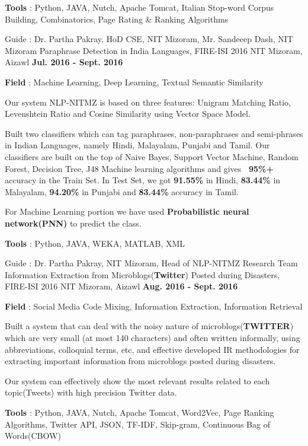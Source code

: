 \begin{cventries}
{\begin{cvitems}
        \item{\textbf{Tools} : Python, JAVA, Nutch, Apache Tomcat, Italian Stop-word Corpus Building, Combinatorics, Page Rating \& Ranking Algorithms}
      \end{cvitems} 
    }
  \cventry
    {Guide : Dr. Partha Pakray, HoD CSE, NIT Mizoram, Mr. Sandeeep Dash, NIT Mizoram}
    {Paraphrase Detection in India Languages, FIRE-ISI 2016}
    {NIT Mizoram, Aizawl}
    {\textbf{Jul. 2016 - Sept. 2016}}
    {
      \begin{cvitems}
      \item{\textbf{Field} : Machine Learning, Deep Learning, Textual Semantic Similarity}
        \item {Our system  NLP-NITMZ is based on three features: Unigram Matching Ratio, Levenshtein Ratio and Cosine Similarity using Vector Space Model.}
        \item {Built two classifiers which can tag paraphrases, non-paraphrases and semi-phrases in Indian Languages,
namely Hindi, Malayalam, Punjabi and Tamil. Our classifiers are built on the top of Naive Bayes, Support Vector Machine,
Random Forest, Decision Tree, J48 Machine learning algorithms and gives \textbf{~95\%+} accuracy in the Train Set. In Test Set, we got \textbf{91.55\%} in Hindi, \textbf{83.44\%} in Malayalam, \textbf{94.20\%} in Punjabi and \textbf{83.44\%} accuracy in Tamil.}
    \item{For Machine Learning portion we have used \textbf{Probabilistic neural network(PNN)} to predict the class.}
    \item{\textbf{Tools} : Python, JAVA, WEKA, MATLAB, XML}
      \end{cvitems}
    }
  \cventry
    {Guide : Dr. Partha Pakray, NIT Mizoram, Head of NLP-NITMZ Research Team}
    {Information Extraction from Microblogs(\textbf{Twitter}) Posted during Disasters, FIRE-ISI 2016}
    {NIT Mizoram, Aizawl}
    {\textbf{Aug. 2016 - Sept. 2016}}
    {
      \begin{cvitems}
        \item{\textbf{Field} : Social Media Code Mixing, Information Extraction, Information Retrieval}
        \item{Built a system that can deal with the noisy nature of microblogs(\textbf{TWITTER}) which are very small (at most 140 characters) and often written informally, using abbreviations, colloquial terms, etc, and 
effective developed IR methodologies for extracting important information from microblogs posted during disasters.}
        \item{Our system can effectively show the most relevant results related to each topic(Tweets) with high precision Twitter data.}
        \item{\textbf{Tools} : Python, JAVA, Nutch, Apache Tomcat, Word2Vec, Page Ranking Algorithms, Twitter API, JSON, TF-IDF, Skip-gram, Continuous Bag of Words(CBOW)}
      \end{cvitems} 
    }
\end{cventries}  

